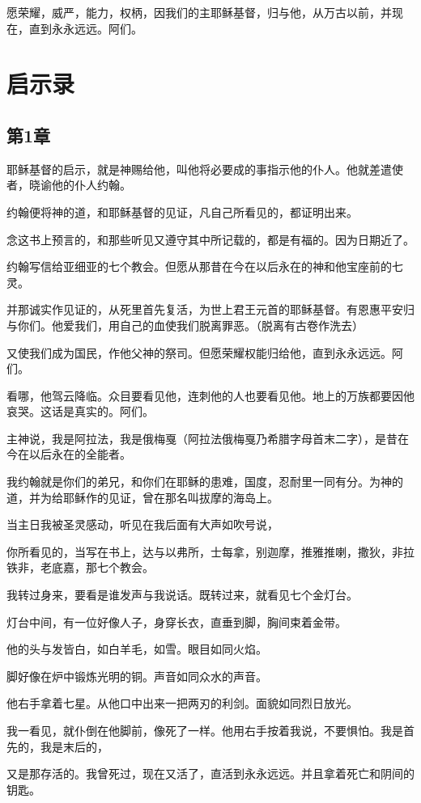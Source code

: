 \documentclass[12pt,oneside]{book}
\begin{document}
愿荣耀，威严，能力，权柄，因我们的主耶稣基督，归与他，从万古以前，并现在，直到永永远远。阿们。

\part{启示录}
\chapter{第1章}
耶稣基督的启示，就是神赐给他，叫他将必要成的事指示他的仆人。他就差遣使者，晓谕他的仆人约翰。

约翰便将神的道，和耶稣基督的见证，凡自己所看见的，都证明出来。

念这书上预言的，和那些听见又遵守其中所记载的，都是有福的。因为日期近了。

约翰写信给亚细亚的七个教会。但愿从那昔在今在以后永在的神和他宝座前的七灵。

并那诚实作见证的，从死里首先复活，为世上君王元首的耶稣基督。有恩惠平安归与你们。他爱我们，用自己的血使我们脱离罪恶。（脱离有古卷作洗去）

又使我们成为国民，作他父神的祭司。但愿荣耀权能归给他，直到永永远远。阿们。

看哪，他驾云降临。众目要看见他，连刺他的人也要看见他。地上的万族都要因他哀哭。这话是真实的。阿们。

主神说，我是阿拉法，我是俄梅戛（阿拉法俄梅戛乃希腊字母首末二字），是昔在今在以后永在的全能者。

我约翰就是你们的弟兄，和你们在耶稣的患难，国度，忍耐里一同有分。为神的道，并为给耶稣作的见证，曾在那名叫拔摩的海岛上。

当主日我被圣灵感动，听见在我后面有大声如吹号说，

你所看见的，当写在书上，达与以弗所，士每拿，别迦摩，推雅推喇，撒狄，非拉铁非，老底嘉，那七个教会。

我转过身来，要看是谁发声与我说话。既转过来，就看见七个金灯台。

灯台中间，有一位好像人子，身穿长衣，直垂到脚，胸间束着金带。

他的头与发皆白，如白羊毛，如雪。眼目如同火焰。

脚好像在炉中锻炼光明的铜。声音如同众水的声音。

他右手拿着七星。从他口中出来一把两刃的利剑。面貌如同烈日放光。

我一看见，就仆倒在他脚前，像死了一样。他用右手按着我说，不要惧怕。我是首先的，我是末后的，

又是那存活的。我曾死过，现在又活了，直活到永永远远。并且拿着死亡和阴间的钥匙。
\end{document}
